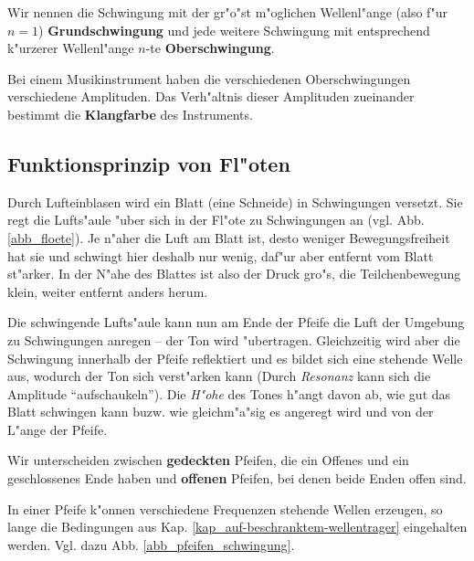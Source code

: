 \bigskip

\begin{Def}
   Wir nennen die Schwingung mit der gr"o"st m"oglichen Wellenl"ange (also
   f"ur $n = 1$) \textbf{Grundschwingung} und
   jede weitere Schwingung mit entsprechend k"urzerer Wellenl"ange
   $n$-te \textbf{Oberschwingung}.
\end{Def}

Bei einem Musikinstrument haben die verschiedenen Oberschwingungen
verschiedene Amplituden. Das Verh"altnis dieser Amplituden zueinander
bestimmt die \textbf{Klangfarbe} des Instruments.






\subsection{Funktionsprinzip von Fl"oten}
\label{kap_funktionsprinzip-von-floten}


Durch Lufteinblasen wird ein Blatt (eine Schneide) in Schwingungen
versetzt. Sie regt die Lufts"aule "uber sich in der Fl"ote zu
Schwingungen an (vgl. Abb. \ref{abb_floete}). Je n"aher die Luft am
Blatt ist, desto weniger Bewegungsfreiheit hat sie und schwingt hier
deshalb nur wenig, daf"ur aber entfernt vom Blatt st"arker.  In der N"ahe
des Blattes ist also der Druck gro"s, die Teilchenbewegung klein,
weiter entfernt anders herum.

Die schwingende Lufts"aule kann nun am Ende der Pfeife die Luft der
Umgebung zu Schwingungen anregen -- der Ton wird
"ubertragen. Gleichzeitig wird aber die Schwingung innerhalb der
Pfeife reflektiert und es bildet sich eine stehende Welle aus, wodurch
der Ton sich verst"arken kann (Durch \emph{Resonanz}
kann sich die Amplitude "`aufschaukeln"').  Die \emph{H"ohe} des Tones
h"angt davon ab, wie gut das Blatt schwingen kann buzw. wie
gleichm"a"sig es angeregt wird und von der L"ange der Pfeife.

Wir unterscheiden zwischen \textbf{gedeckten}
Pfeifen, die ein Offenes und ein geschlossenes Ende haben und
\textbf{offenen} Pfeifen, bei denen beide Enden
offen sind.

In einer Pfeife k"onnen verschiedene Frequenzen stehende Wellen
erzeugen, so lange die Bedingungen aus
Kap. \ref{kap_auf-beschranktem-wellentrager} eingehalten
werden. Vgl. dazu Abb. \ref{abb_pfeifen_schwingung}.


